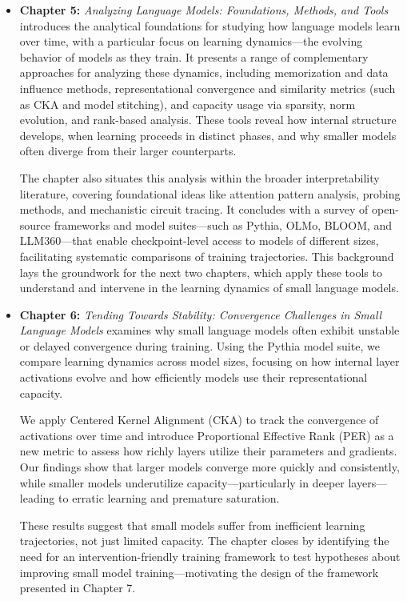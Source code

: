 \begin{itemize}
    \item \textbf{Chapter 5:} \emph{Analyzing Language Models: Foundations, Methods, and Tools} introduces the analytical foundations for studying how language models learn over time, with a particular focus on learning dynamics—the evolving behavior of models as they train. It presents a range of complementary approaches for analyzing these dynamics, including memorization and data influence methods, representational convergence and similarity metrics (such as CKA and model stitching), and capacity usage via sparsity, norm evolution, and rank-based analysis. These tools reveal how internal structure develops, when learning proceeds in distinct phases, and why smaller models often diverge from their larger counterparts.

    The chapter also situates this analysis within the broader interpretability literature, covering foundational ideas like attention pattern analysis, probing methods, and mechanistic circuit tracing. It concludes with a survey of open-source frameworks and model suites—such as Pythia, OLMo, BLOOM, and LLM360—that enable checkpoint-level access to models of different sizes, facilitating systematic comparisons of training trajectories. This background lays the groundwork for the next two chapters, which apply these tools to understand and intervene in the learning dynamics of small language models.

    \item \textbf{Chapter 6:} \emph{Tending Towards Stability: Convergence Challenges in Small Language Models} examines why small language models often exhibit unstable or delayed convergence during training. Using the Pythia model suite, we compare learning dynamics across model sizes, focusing on how internal layer activations evolve and how efficiently models use their representational capacity.

    We apply Centered Kernel Alignment (CKA) to track the convergence of activations over time and introduce Proportional Effective Rank (PER) as a new metric to assess how richly layers utilize their parameters and gradients. Our findings show that larger models converge more quickly and consistently, while smaller models underutilize capacity—particularly in deeper layers—leading to erratic learning and premature saturation.
    
    These results suggest that small models suffer from inefficient learning trajectories, not just limited capacity. The chapter closes by identifying the need for an intervention-friendly training framework to test hypotheses about improving small model training—motivating the design of the \pico framework presented in Chapter 7.


\end{itemize}
